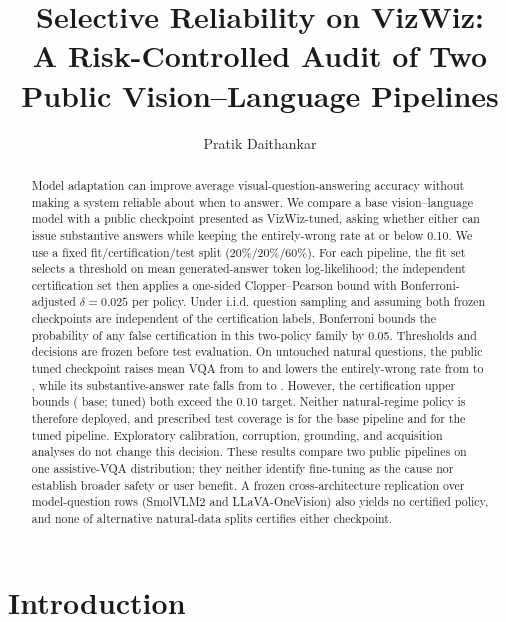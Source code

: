 \documentclass[11pt]{article}
\title{Selective Reliability on VizWiz:\\
\large A Risk-Controlled Audit of Two Public Vision--Language Pipelines}
\author{Pratik Daithankar}
\date{}
\newcommand{\TargetRisk}{0.10}
\newcommand{\FamilyFailureProb}{0.05}
\newcommand{\PrimaryFailureProb}{0.025}
\newcommand{\FitFraction}{20\%}
\newcommand{\CertFraction}{20\%}
\newcommand{\TestFraction}{60\%}
\newcommand{\TestN}{}
\newcommand{\BaseVQA}{}
\newcommand{\TunedVQA}{}
\newcommand{\BaseWrongRate}{}
\newcommand{\TunedWrongRate}{}
\newcommand{\BaseCertUpper}{}
\newcommand{\TunedCertUpper}{}
\newcommand{\BaseTestCoverage}{}
\newcommand{\TunedTestCoverage}{}
\newcommand{\BaseSubstantiveRate}{}
\newcommand{\TunedSubstantiveRate}{}
\newcommand{\RepRows}{}
\newcommand{\RepSensitivityN}{}
\begin{document}
\maketitle

\begin{abstract}
Model adaptation can improve average visual-question-answering accuracy without
making a system reliable about when to answer.  We compare a base
vision--language model with a public checkpoint presented as VizWiz-tuned, asking
whether either can issue substantive answers while keeping the entirely-wrong
rate at or below \TargetRisk{}.  We use a fixed fit/certification/test split
(\FitFraction/\CertFraction/\TestFraction).  For each pipeline, the fit set
selects a threshold on mean generated-answer token log-likelihood; the independent
certification set then applies a one-sided Clopper--Pearson bound with
Bonferroni-adjusted $\delta=\PrimaryFailureProb$ per policy.  Under i.i.d.
question sampling and assuming both frozen checkpoints are independent of the
certification labels, Bonferroni bounds the probability of any false certification
in this two-policy family by \FamilyFailureProb{}.  Thresholds and decisions are
frozen before test evaluation.  On
\TestN{} untouched natural questions, the public tuned checkpoint raises mean
VQA from \BaseVQA{} to \TunedVQA{} and lowers the entirely-wrong rate from
\BaseWrongRate{} to \TunedWrongRate{}, while its substantive-answer rate falls
from \BaseSubstantiveRate{} to \TunedSubstantiveRate{}.  However, the
certification upper bounds (\BaseCertUpper{} base; \TunedCertUpper{} tuned) both
exceed the \TargetRisk{} target.  Neither natural-regime policy is therefore
deployed, and prescribed test coverage is \BaseTestCoverage{} for the base
pipeline and \TunedTestCoverage{} for the tuned pipeline.  Exploratory
calibration, corruption, grounding, and acquisition analyses do not change this
decision.  These results compare two public pipelines on one assistive-VQA
distribution; they neither identify fine-tuning as the cause nor establish
broader safety or user benefit.  A frozen cross-architecture replication over
\RepRows{} model-question rows (SmolVLM2 and LLaVA-OneVision) also yields no
certified policy, and none of \RepSensitivityN{} alternative natural-data splits
certifies either checkpoint.
\end{abstract}

\section{Introduction}
\end{document}
